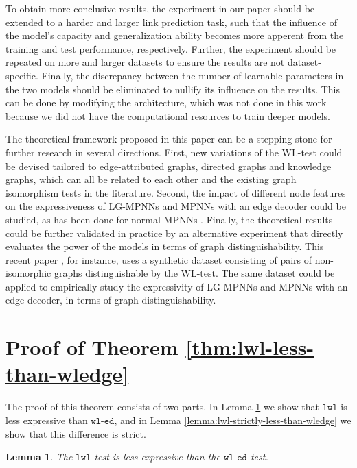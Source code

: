 \documentclass{article}
\newtheorem{lemma}[theorem]{Lemma}
\newcommand{\wledge}{\texttt{wl-ed}}
\newcommand{\lwl}{\texttt{lwl}}
\begin{document}
To obtain more conclusive results, the experiment in our paper should be extended to a harder and larger link prediction task, such that the influence of the model's capacity and generalization ability becomes more apperent from the training and test performance, respectively. Further, the experiment should be repeated on more and larger datasets to ensure the results are not dataset-specific. Finally, the discrepancy between the number of learnable parameters in the two models should be eliminated to nullify its influence on the results. This can be done by modifying the architecture, which was not done in this work because we did not have the computational resources to train deeper models.

The theoretical framework proposed in this paper can be a stepping stone for further research in several directions.
First, new variations of the WL-test could be devised tailored to edge-attributed graphs, directed graphs and knowledge graphs, which can all be related to each other and the existing graph isomorphism tests in the literature.
Second, the impact of different node features on the expressiveness of LG-MPNNs and MPNNs with an edge decoder could be studied, as has been done for normal MPNNs \cite{sato2021random,feldman2022weisfeiler}.
Finally, the theoretical results could be further validated in practice by an alternative experiment that directly evaluates the power of the models in terms of graph distinguishability. This recent paper \cite{bianchi2024expressive}, for instance, uses a synthetic dataset consisting of pairs of non-isomorphic graphs distinguishable by the WL-test. The same dataset could be applied to empirically study the expressivity of LG-MPNNs and MPNNs with an edge decoder, in terms of graph distinguishability.




\appendix
\section{Proof of Theorem \ref{thm:lwl-less-than-wledge}}   \label{app:proof-lwl-less-than-wledge}

The proof of this theorem consists of two parts. In Lemma \ref{lemma:lwl-less-than-wledge} we show that $\lwl$ is less expressive than $\wledge$, and in Lemma \ref{lemma:lwl-strictly-less-than-wledge} we show that this difference is strict.

\begin{lemma}   \label{lemma:lwl-less-than-wledge}
    The $\lwl$-test is less expressive than the $\wledge$-test.
\end{lemma}
\end{document}

